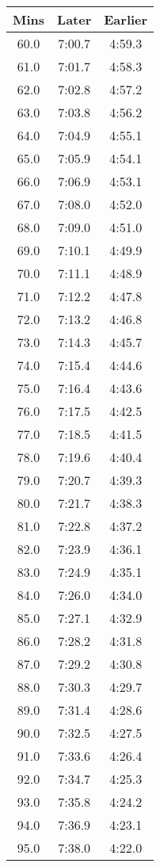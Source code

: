 \begin{footnotesize}
\begin{minipage}{0.25\textwidth}\begin{tabular}[t]{c|c|c}
			Mins&Later&Earlier\\\hline
	60.0&7:00.7&4:59.3\\\hline
		61.0&7:01.7&4:58.3\\\hline
	62.0&7:02.8&4:57.2\\\hline
	63.0&7:03.8&4:56.2\\\hline
	64.0&7:04.9&4:55.1\\\hline
	65.0&7:05.9&4:54.1\\\hline
	66.0&7:06.9&4:53.1\\\hline
	67.0&7:08.0&4:52.0\\\hline
	68.0&7:09.0&4:51.0\\\hline
	69.0&7:10.1&4:49.9\\\hline
	70.0&7:11.1&4:48.9\\\hline
	71.0&7:12.2&4:47.8\\\hline
	72.0&7:13.2&4:46.8\\\hline
	73.0&7:14.3&4:45.7\\\hline
	74.0&7:15.4&4:44.6\\\hline
	75.0&7:16.4&4:43.6\\\hline
	76.0&7:17.5&4:42.5\\\hline
	77.0&7:18.5&4:41.5\\\hline
	78.0&7:19.6&4:40.4\\\hline
	79.0&7:20.7&4:39.3\\\hline
	80.0&7:21.7&4:38.3\\\hline
	81.0&7:22.8&4:37.2\\\hline
	82.0&7:23.9&4:36.1\\\hline
	83.0&7:24.9&4:35.1\\\hline
	84.0&7:26.0&4:34.0\\\hline
	85.0&7:27.1&4:32.9\\\hline
	86.0&7:28.2&4:31.8\\\hline
	87.0&7:29.2&4:30.8\\\hline
	88.0&7:30.3&4:29.7\\\hline
	89.0&7:31.4&4:28.6\\\hline
	90.0&7:32.5&4:27.5\\\hline
	91.0&7:33.6&4:26.4\\\hline
	92.0&7:34.7&4:25.3\\\hline
	93.0&7:35.8&4:24.2\\\hline
	94.0&7:36.9&4:23.1\\\hline
	95.0&7:38.0&4:22.0\\\hline

\end{tabular}
\end{minipage}
\end{footnotesize}
